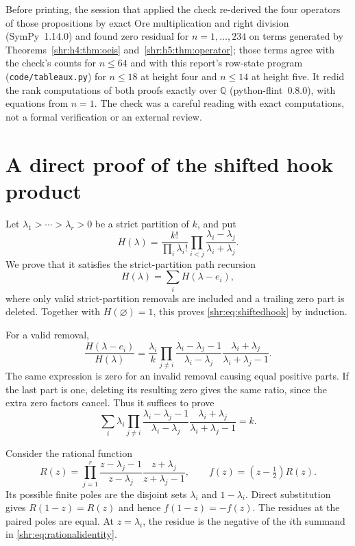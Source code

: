 \documentclass[11pt,letterpaper]{article}
\numberwithin{equation}{section}
\theoremstyle{definition}
\newcommand{\Q}{\mathbb Q}
\newcommand{\1}{\mathbf 1}
\begin{document}
Before printing, the session that applied the check re-derived the four
operators of those propositions by exact Ore multiplication and right
division (SymPy~1.14.0) and found zero residual for $n=1,\ldots,234$ on
terms generated by Theorems~\ref{shr:h4:thm:oeis}
and~\ref{shr:h5:thm:operator}; those terms agree with the check's counts
for $n\le64$ and with this report's row-state program
(\texttt{code/tableaux.py}) for $n\le18$ at height four and $n\le14$ at
height five. It redid the rank computations of both proofs exactly over
$\Q$ (python-flint~0.8.0), with equations from $n=1$. The check was a
careful reading with exact computations, not a formal verification or an
external review.

\appendix
\section{A direct proof of the shifted hook product}\label{shr:app:hook}

Let $\lambda_1>\cdots>\lambda_r>0$ be a strict partition of $k$, and put
\[
 H(\lambda)=\frac{k!}{\prod_i\lambda_i!}
 \prod_{i<j}\frac{\lambda_i-\lambda_j}{\lambda_i+\lambda_j}.
\]
We prove that it satisfies the strict-partition path recursion
\begin{equation}
 H(\lambda)=\sum_i H(\lambda-e_i),
 \label{shr:eq:hookrec}
\end{equation}
where only valid strict-partition removals are included and a trailing zero
part is deleted. Together with $H(\varnothing)=1$, this proves
\eqref{shr:eq:shiftedhook} by induction.

For a valid removal,
\begin{equation}
 \frac{H(\lambda-e_i)}{H(\lambda)}
 =\frac{\lambda_i}{k}
 \prod_{j\ne i}
 \frac{\lambda_i-\lambda_j-1}{\lambda_i-\lambda_j}
 \frac{\lambda_i+\lambda_j}{\lambda_i+\lambda_j-1}.
 \label{shr:eq:removalratio}
\end{equation}
The same expression is zero for an invalid removal causing equal positive
parts. If the last part is one, deleting its resulting zero gives the
same ratio, since the extra zero factors cancel. Thus it suffices to prove
\begin{equation}
 \sum_i\lambda_i
 \prod_{j\ne i}
 \frac{\lambda_i-\lambda_j-1}{\lambda_i-\lambda_j}
 \frac{\lambda_i+\lambda_j}{\lambda_i+\lambda_j-1}=k.
 \label{shr:eq:rationalidentity}
\end{equation}

Consider the rational function
\[
 R(z)=\prod_{j=1}^r
 \frac{z-\lambda_j-1}{z-\lambda_j}
 \frac{z+\lambda_j}{z+\lambda_j-1},\qquad
 f(z)=(z-\tfrac12)R(z).
\]
Its possible finite poles are the disjoint sets $\lambda_i$ and
$1-\lambda_i$. Direct substitution gives $R(1-z)=R(z)$ and hence
$f(1-z)=-f(z)$. The residues at the paired poles are equal. At
$z=\lambda_i$, the residue is the negative of the $i$th summand in
\eqref{shr:eq:rationalidentity}.
\end{document}
